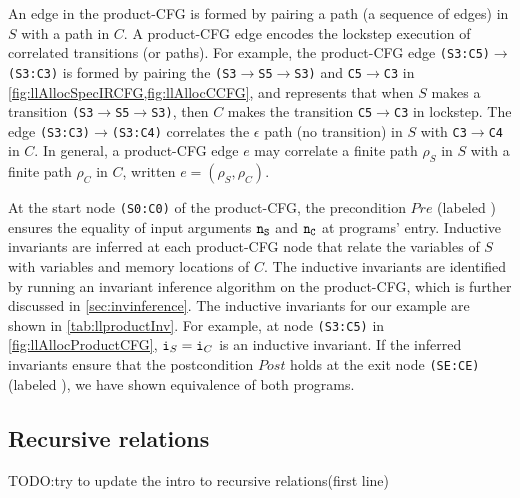 An edge in the product-CFG is formed by pairing a path (a sequence of edges) in $S$ with a path in $C$.
A product-CFG edge encodes the lockstep execution of correlated
transitions (or paths).
For example, the product-CFG edge {\tt (S3:C5)}$\rightarrow${\tt (S3:C3)} is formed by pairing the
{\small \tt (S3$\rightarrow$S5$\rightarrow$S3)} and {\small \tt C5$\rightarrow$C3}
in \cref{fig:llAllocSpecIRCFG,fig:llAllocCCFG},
and represents that when $S$ makes a transition {\small \tt (S3$\rightarrow$S5$\rightarrow$S3)},
then $C$ makes the transition {\small \tt C5$\rightarrow$C3}
in lockstep.
The edge {\small \tt (S3:C3)$\rightarrow$(S3:C4)}
correlates the $\epsilon$ path (no transition) in $S$ with {\small \tt C3$\rightarrow$C4} in $C$.
In general, a product-CFG edge $e$ may correlate a finite path $\rho_S$
in $S$ with a finite path $\rho_C$ in $C$,
written $e=(\rho_S,\rho_C)$.



At the start node {\tt (S0:C0)} of the product-CFG, the precondition $Pre$
(labeled )
ensures the equality
of input arguments ${\tt n_{S}}$ and ${\tt n_{C}}$ at programs' entry.
Inductive invariants are inferred at each
product-CFG node that
relate the variables of $S$ with variables
and memory locations of $C$.
The inductive invariants
are identified by running an invariant inference
algorithm on the product-CFG, which is further discussed in \cref{sec:invinference}.
The inductive invariants
for our example are shown in \cref{tab:llproductInv}.
For example, at node {\tt (S3:C5)} in \cref{fig:llAllocProductCFG},
${\tt i}_S={\tt i}_C$ is an inductive
invariant. If the inferred invariants ensure
that the postcondition $Post$ holds at the
exit node {\tt (SE:CE)} (labeled ), we have shown
equivalence of both programs.

\subsection{Recursive relations}
TODO:try to update the intro to recursive relations(first line)

